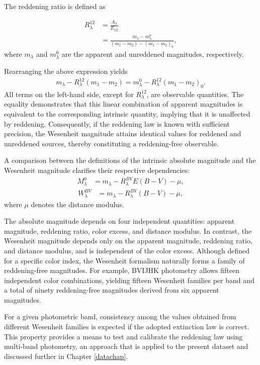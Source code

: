 The reddening ratio is defined as

\begin{align}
R_\lambda^{12} &= \frac{A_\lambda}{E_{12}} \nonumber \\
&= \frac{m_\lambda - m_\lambda^0}{(m_1 - m_2) - (m_1 - m_2)_0},
\end{align}
where $m_\lambda$ and $m_\lambda^0$ are the apparent and unreddened magnitudes, respectively.

Rearranging the above expression yields
\begin{align}
m_\lambda - R_\lambda^{12}(m_1 - m_2)
= m_\lambda^0 - R_\lambda^{12}(m_1 - m_2)_0.
\end{align}
All terms on the left-hand side, except for $R_\lambda^{12}$, are observable quantities. The equality demonstrates that this linear combination of apparent magnitudes is equivalent to the corresponding intrinsic quantity, implying that it is unaffected by reddening. Consequently, if the reddening law is known with sufficient precision, the Wesenheit magnitude attains identical values for reddened and unreddened sources, thereby constituting a reddening-free observable.

%

A comparison between the definitions of the intrinsic absolute magnitude and the Wesenheit magnitude clarifies their respective dependencies:
\begin{align}\label{mag_eq}
M_\lambda^0 &= m_\lambda - R_\lambda^{BV} E(B-V) - \mu,
\end{align}
\begin{align}\label{wes_eq}
W_\lambda^{BV} &= m_\lambda - R_\lambda^{BV}(B-V) - \mu,
\end{align}
where $\mu$ denotes the distance modulus.

The absolute magnitude depends on four independent quantities: apparent magnitude, reddening ratio, color excess, and distance modulus. In contrast, the Wesenheit magnitude depends only on the apparent magnitude, reddening ratio, and distance modulus, and is independent of the color excess. Although defined for a specific color index, the Wesenheit formalism naturally forms a family of reddening-free magnitudes. For example, BVIJHK photometry allows fifteen independent color combinations, yielding fifteen Wesenheit families per band and a total of ninety reddening-free magnitudes derived from six apparent magnitudes.

For a given photometric band, consistency among the values obtained from different Wesenheit families is expected if the adopted extinction law is correct. This property provides a means to test and calibrate the reddening law using multi-band photometry, an approach that is applied to the present dataset and discussed further in Chapter \ref{datachap}.

